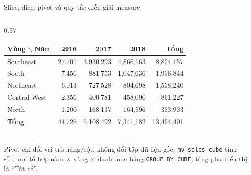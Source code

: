 \documentclass[aspectratio=169,10pt,xcolor=table]{beamer}
\begin{document}
\begin{frame}{Slice, dice, pivot và quy tắc diễn giải measure}
\begin{columns}[T]
\begin{column}{0.57\textwidth}
\begin{tabular}{@{}lrrrr@{}}
        \toprule
        Vùng $\backslash$ Năm & 2016 & 2017 & 2018 & Tổng\\
        \midrule
        Southeast & 27,701 & 3,930,293 & 4,866,163 & 8,824,157\\
        South & 7,456 & 881,753 & 1,047,636 & 1,936,844\\
        Northeast & 6,013 & 727,528 & 804,698 & 1,538,240\\
        Central-West & 2,356 & 400,781 & 458,090 & 861,227\\
        North & 1,200 & 168,137 & 164,596 & 333,933\\
        \midrule
        \textbf{Tổng} & 44,726 & 6,108,492 & 7,341,182 & 13,494,401\\
        \bottomrule
      \end{tabular}\\[0.2cm]
      Pivot chỉ đổi vai trò hàng/cột, không đổi tập dữ liệu gốc. \texttt{mv\_sales\_cube} tính sẵn mọi tổ hợp năm $\times$ vùng $\times$ danh mục bằng \texttt{GROUP BY CUBE}, tổng phụ hiển thị là ``Tất cả''.
    \end{column}
  \end{columns}
\end{frame}
\end{document}
